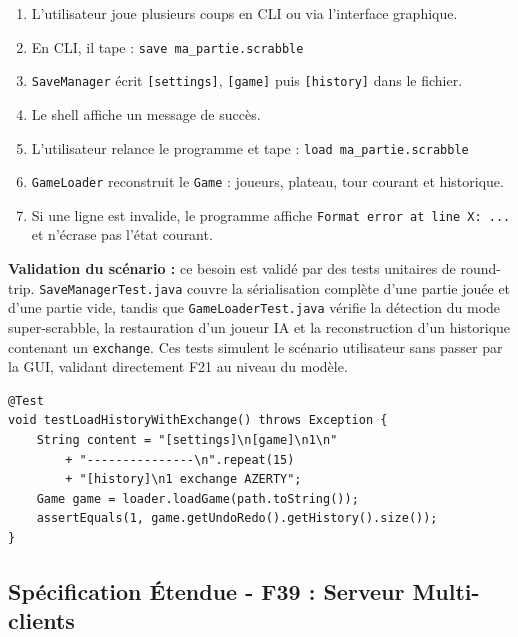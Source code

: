 \documentclass[a4paper]{article}
\begin{document}
\begin{enumerate}
    \item L'utilisateur joue plusieurs coups en CLI ou via l'interface graphique.
    \item En CLI, il tape : \texttt{save ma\_partie.scrabble}
    \item \texttt{SaveManager} écrit \texttt{[settings]}, \texttt{[game]} puis \texttt{[history]} dans le fichier.
    \item Le shell affiche un message de succès.
    \item L'utilisateur relance le programme et tape : \texttt{load ma\_partie.scrabble}
    \item \texttt{GameLoader} reconstruit le \texttt{Game} : joueurs, plateau, tour courant et historique.
    \item Si une ligne est invalide, le programme affiche \texttt{Format error at line X: ...} et n'écrase pas l'état courant.
\end{enumerate}

\begin{tcolorbox}[colback=blue!5!white, colframe=blue!75!black, title=Stratégie de validation]
\textbf{Validation du scénario :} ce besoin est validé par des tests unitaires de round-trip. \texttt{SaveManagerTest.java} couvre la sérialisation complète d'une partie jouée et d'une partie vide, tandis que \texttt{GameLoaderTest.java} vérifie la détection du mode super-scrabble, la restauration d'un joueur IA et la reconstruction d'un historique contenant un \texttt{exchange}. Ces tests simulent le scénario utilisateur sans passer par la GUI, validant directement F21 au niveau du modèle.

\begin{verbatim}
@Test
void testLoadHistoryWithExchange() throws Exception {
    String content = "[settings]\n[game]\n1\n"
        + "---------------\n".repeat(15)
        + "[history]\n1 exchange AZERTY";
    Game game = loader.loadGame(path.toString());
    assertEquals(1, game.getUndoRedo().getHistory().size());
}
\end{verbatim}
\end{tcolorbox}


\subsection{Spécification Étendue - F39 : Serveur Multi-clients}
\end{document}
